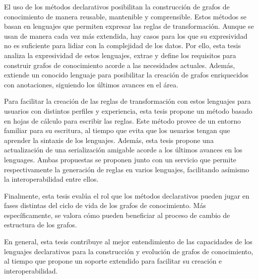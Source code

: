 El uso de los métodos declarativos posibilitan la construcción de grafos de conocimiento de manera reusable, mantenible y comprensible. Estos métodos se basan en lenguajes que permiten expresar las reglas de transformación. Aunque se usan de manera cada vez más extendida, hay casos para los que su expresividad no es suficiente para lidiar con la complejidad de los datos. Por ello, esta tesis analiza la expresividad de estos lenguajes, extrae y define los requisitos para construir grafos de conocimiento acorde a las necesidades actuales. Además, extiende un conocido lenguaje para posibilitar la creación de grafos enriquecidos con anotaciones, siguiendo los últimos avances en el área.

Para facilitar la creación de las reglas de transformación con estos lenguajes para usuarios con distintos perfiles y experiencia, esta tesis propone un método basado en hojas de cálculo para escribir las reglas. Este método provee de un entorno familiar para su escritura, al tiempo que evita que los usuarios tengan que aprender la sintaxis de los lenguajes. Además, esta tesis propone una actualización de una serialización amigable acorde a los últimos avances en los lenguages. Ambas propuestas se proponen junto con un servicio que permite respectivamente la generación de reglas en varios lenguajes, facilitando asímismo la interoperabilidad entre ellos.

Finalmente, esta tesis evalúa el rol que los métodos declarativos pueden jugar en fases distintas del ciclo de vida de los grafos de conocimiento. Más específicamente, se valora cómo pueden beneficiar al proceso de cambio de estructura de los grafos. 

En general, esta tesis contribuye al mejor entendimiento de las capacidades de los lenguajes declarativos para la construcción y evolución de grafos de conocimiento, al tiempo que propone un soporte extendido para facilitar su creación e interoperabilidad. 
